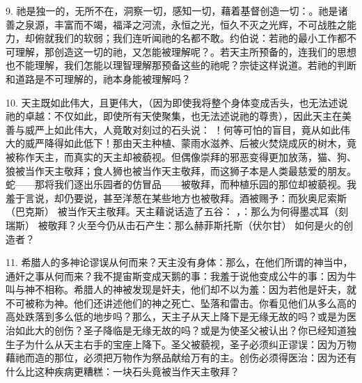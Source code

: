 9. 祂是独一的，无所不在，洞察一切，感知一切，藉着基督创造一切：。祂是诸善之泉源，丰富而不竭，福泽之河流，永恒之光，恒久不灭之光辉，不可战胜之能力，却俯就我们的软弱；我们连听闻祂的名都不敢。约伯说：若祂的最小工作都不可理解，那创造这一切的祂，又怎能被理解呢？。若天主所预备的，连我们的思想也不能理解，我们怎能以理智理解那预备这些的祂呢？宗徒这样说道。若祂的判断和道路是不可理解的，祂本身能被理解吗？\par

10. 天主既如此伟大，且更伟大，（因为即使我将整个身体变成舌头，也无法述说祂的卓越：不仅如此，即使所有天使聚集，也无法述说祂的尊贵），因此天主在美善与威严上如此伟大，人竟敢对刻过的石头说： ！何等可怕的盲目，竟从如此伟大的威严降得如此低下！那由天主种植、蒙雨水滋养、后被火焚烧成灰的树木，竟被称作天主，而真实的天主却被藐视。但偶像崇拜的邪恶变得更加放荡，猫、狗、狼被当作天主敬拜；食人狮也被当作天主敬拜，而这狮子本是人类最慈爱的朋友。蛇——那将我们逐出乐园者的仿冒品——被敬拜，而种植乐园的那位却被藐视。我羞于言说，却仍要说，甚至洋葱在某些地方也被敬拜。酒被赐予：而狄奥尼索斯（巴克斯） 被当作天主敬拜。天主藉说话造了五谷： ，：那么为何得墨忒耳（刻瑞斯） 被敬拜？火至今仍从击石产生：那么赫菲斯托斯（伏尔甘） 如何是火的创造者？\par

11. 希腊人的多神论谬误从何而来？天主没有身体：那么，在他们所谓的神当中，通奸之事从何而来？我不提宙斯变成天鹅的事：我羞于说他变成公牛的事：因为牛叫与神不相称。希腊人的神被发现是奸夫，他们却不以为羞：因为若他是奸夫，就不可被称为神。他们还讲述他们的神之死亡、坠落和雷击。你看见他们从多么高的高处跌落到多么低的地步吗？那么，天主子从天上降下是无缘无故的吗？或是为医治如此大的创伤？圣子降临是无缘无故的吗？或是为使圣父被认出？你已经知道独生子为什么从天主右手的宝座上降下。圣父被藐视，圣子必须纠正谬误：因为万物藉祂而造的那位，必须把万物作为祭品献给万有的主。创伤必须得医治：因为还有什么比这种疾病更糟糕：一块石头竟被当作天主敬拜？\par

